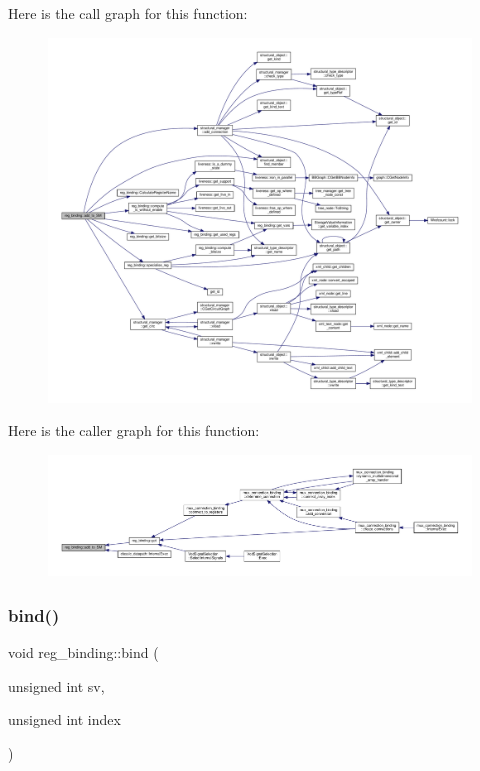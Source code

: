 Here is the call graph for this function\+:
\nopagebreak
\begin{figure}[H]
\begin{center}
\leavevmode
\includegraphics[width=350pt]{da/d7c/classreg__binding_aaf06706babf5b4d7ed2bc1c9849fd10a_cgraph}
\end{center}
\end{figure}
Here is the caller graph for this function\+:
\nopagebreak
\begin{figure}[H]
\begin{center}
\leavevmode
\includegraphics[width=350pt]{da/d7c/classreg__binding_aaf06706babf5b4d7ed2bc1c9849fd10a_icgraph}
\end{center}
\end{figure}
\mbox{\label{classreg__binding_ac9d0eb07575596333db08cda5257c1b6}} 
\subsubsection{\texorpdfstring{bind()}{bind()}}
{\footnotesize\ttfamily void reg\+\_\+binding\+::bind (\begin{DoxyParamCaption}\item[{unsigned int}]{sv,  }\item[{unsigned int}]{index }\end{DoxyParamCaption})}



